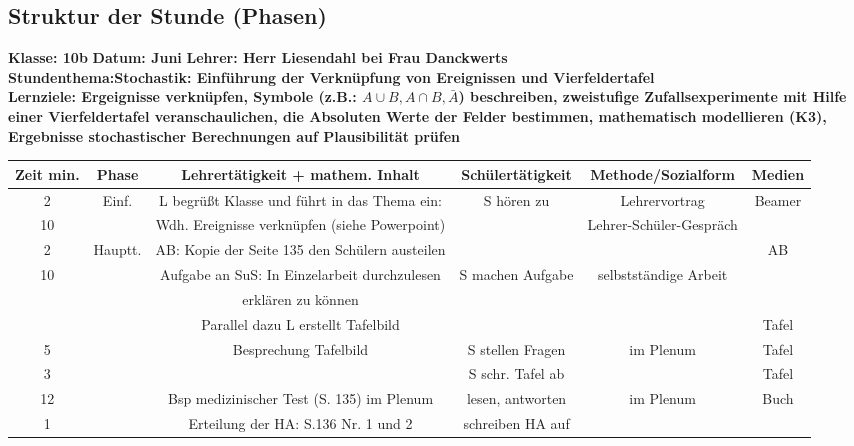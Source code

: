 \documentclass[11pt]{scrartcl}
\begin{document}
\newpage
\begin{landscape}
\section{Struktur der Stunde (Phasen)}
\textbf{Klasse: 10b} \textbf{Datum: Juni} \textbf{Lehrer: Herr Liesendahl bei Frau Danckwerts}\\
\textbf{Stundenthema:Stochastik: Einführung der Verknüpfung von Ereignissen und Vierfeldertafel}\\
\textbf{Lernziele: Ergeignisse verknüpfen, Symbole (z.B.: \(A \cup B,A \cap B, \bar A\)) beschreiben, zweistufige Zufallsexperimente mit Hilfe einer Vierfeldertafel veranschaulichen, die Absoluten Werte der Felder bestimmen, mathematisch modellieren (K3),  Ergebnisse stochastischer Berechnungen auf Plausibilität prüfen}
\begin{center}
\begin{tabular}{|c|c|c|c|c|c|}\hline
Zeit min.& Phase & Lehrertätigkeit + mathem. Inhalt & Schülertätigkeit & Methode/Sozialform & Medien\\\hline
2& Einf. & L begrüßt Klasse und führt in das Thema ein: & S hören zu & Lehrervortrag & Beamer\\\hline
10 &  & Wdh. Ereignisse verknüpfen (siehe Powerpoint)  &  & Lehrer-Schüler-Gespräch & \\\hline
2& Hauptt.& AB: Kopie der Seite 135 den Schülern austeilen  &  &  & AB\\\hline
 10&  &  Aufgabe an SuS: In Einzelarbeit durchzulesen  & S machen Aufgabe & selbstständige Arbeit & \\\hline
 &  & erklären zu können &  &  & \\\hline
 &  & Parallel dazu L erstellt Tafelbild&  &  & Tafel\\\hline
5 &  & Besprechung Tafelbild & S stellen Fragen & im Plenum & Tafel\\\hline
3 &  &  & S schr. Tafel ab &  & Tafel\\\hline
12 &  & Bsp medizinischer Test (S. 135) im Plenum &  lesen, antworten&im Plenum  & Buch\\\hline
 1&  & Erteilung der HA: S.136 Nr. 1 und 2 & schreiben HA auf &  & \\\hline
\end{tabular}
\end{center}
\end {landscape}
\end{document}
